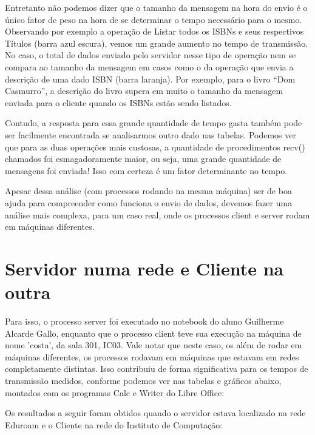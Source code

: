 \documentclass[10pt,a4paper]{report}
\begin{document}
	Entretanto não podemos dizer que o tamanho da mensagem na hora do envio é o único fator de peso na hora de se determinar o tempo necessário para o mesmo. Observando por exemplo a operação de Listar todos os ISBNs e seus respectivos Títulos (barra azul escura), vemos um grande aumento no tempo de transmissão. No caso, o total de dados enviado pelo servidor nesse tipo de operação nem se compara ao tamanho da mensagem em casos como o da operação que envia a descrição de uma dado ISBN (barra laranja). Por exemplo, para o livro “Dom Casmurro”, a descrição do livro supera em muito o tamanho da mensagem enviada para o cliente quando os ISBNs estão sendo listados.
	
	Contudo, a resposta para essa grande quantidade de tempo gasta também pode ser facilmente encontrada se analisarmos outro dado nas tabelas. Podemos ver que para as duas operações mais custosas, a quantidade de procedimentos recv() chamados foi esmagadoramente maior, ou seja, uma grande quantidade de mensagens foi enviada! Isso com certeza é um fator determinante no tempo.
	
	Apesar dessa análise (com processos rodando na mesma máquina) ser de boa ajuda para compreender como funciona o envio de dados, devemos fazer uma análise mais complexa, para um caso real, onde os processos client e server rodam em máquinas diferentes.
	
\newpage
\section{Servidor numa rede e Cliente na outra}
Para isso, o processo server foi executado no notebook do aluno Guilherme Alcarde Gallo, enquanto que o processo client teve sua execução na máquina de nome 'costa', da sala 301, IC03.  Vale notar que neste caso, os além de rodar em máquinas diferentes, os processos rodavam em máquinas que estavam em redes completamente distintas. Isso contribuiu de forma significativa para os tempos de transmissão medidos,  conforme podemos ver nas tabelas e gráficos abaixo, montados com os programas Calc e Writer do Libre Office:

Os resultados a seguir foram obtidos quando o servidor estava localizado na rede Eduroam e o Cliente na rede do Instituto de Computação:
\end{document}
